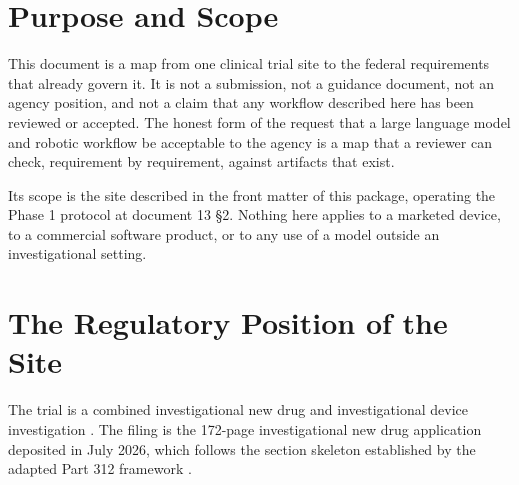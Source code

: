 
\section{Purpose and Scope}

This document is a map from one clinical trial site to the federal requirements
that already govern it. It is not a submission, not a guidance document, not an
agency position, and not a claim that any workflow described here has been
reviewed or accepted. The honest form of the request that a large language model
and robotic workflow be acceptable to the agency is a map that a reviewer can
check, requirement by requirement, against artifacts that exist.

Its scope is the site described in the front matter of this package, operating
the Phase 1 protocol at document 13 §2. Nothing here applies to a marketed
device, to a commercial software product, or to any use of a model outside an
investigational setting.

\section{The Regulatory Position of the Site}

The trial is a combined investigational new drug and investigational device
investigation \cite{phase1protocol}. The filing is the 172-page investigational
new drug application deposited in July 2026, which follows the section skeleton
established by the adapted Part 312 framework \cite{indapp,cfr312adapt}.

